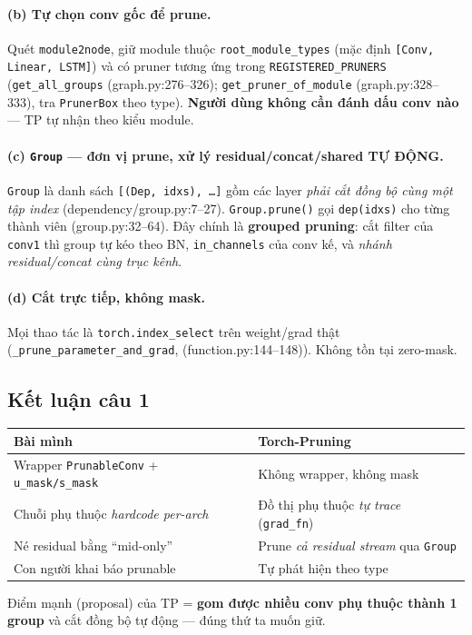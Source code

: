 \documentclass[11pt,a4paper]{article}
\newcommand{\code}[1]{\texttt{#1}}
\newcommand{\src}[1]{{\small\ttfamily(#1)}}   %
\begin{document}
\paragraph{(b) Tự chọn conv gốc để prune.}
Quét \code{module2node}, giữ module thuộc \code{root\_module\_types} (mặc định \code{[Conv, Linear,
LSTM]}) và có pruner tương ứng trong \code{REGISTERED\_PRUNERS} (\code{get\_all\_groups}
\src{graph.py:276--326}; \code{get\_pruner\_of\_module} \src{graph.py:328--333}, tra \code{PrunerBox}
theo type). \textbf{Người dùng không cần đánh dấu conv nào} --- TP tự nhận theo kiểu module.

\paragraph{(c) \code{Group} --- đơn vị prune, xử lý residual/concat/shared TỰ ĐỘNG.}
\code{Group} là danh sách \code{[(Dep, idxs), \ldots]} gồm các layer \emph{phải cắt đồng bộ cùng một
tập index} \src{dependency/group.py:7--27}. \code{Group.prune()} gọi \code{dep(idxs)} cho từng thành
viên \src{group.py:32--64}. Đây chính là \textbf{grouped pruning}: cắt filter của \code{conv1} thì
group tự kéo theo BN, \code{in\_channels} của conv kế, và \emph{nhánh residual/concat cùng trục kênh}.

\paragraph{(d) Cắt trực tiếp, không mask.}
Mọi thao tác là \code{torch.index\_select} trên weight/grad thật
(\code{\_prune\_parameter\_and\_grad}, \src{function.py:144--148}). Không tồn tại zero-mask.

\subsection{Kết luận câu 1}
\begin{center}
\begin{tabular}{@{}p{6.2cm}p{6.2cm}@{}}
\hline
\textbf{Bài mình} & \textbf{Torch-Pruning}\\
\hline
Wrapper \code{PrunableConv} + \code{u\_mask/s\_mask} & Không wrapper, không mask\\
Chuỗi phụ thuộc \emph{hardcode per-arch} & Đồ thị phụ thuộc \emph{tự trace} (\code{grad\_fn})\\
Né residual bằng ``mid-only'' & Prune \emph{cả residual stream} qua \code{Group}\\
Con người khai báo prunable & Tự phát hiện theo type\\
\hline
\end{tabular}
\end{center}
\noindent Điểm mạnh (proposal) của TP = \textbf{gom được nhiều conv phụ thuộc thành 1 group} và cắt
đồng bộ tự động --- đúng thứ ta muốn giữ.
\end{document}
